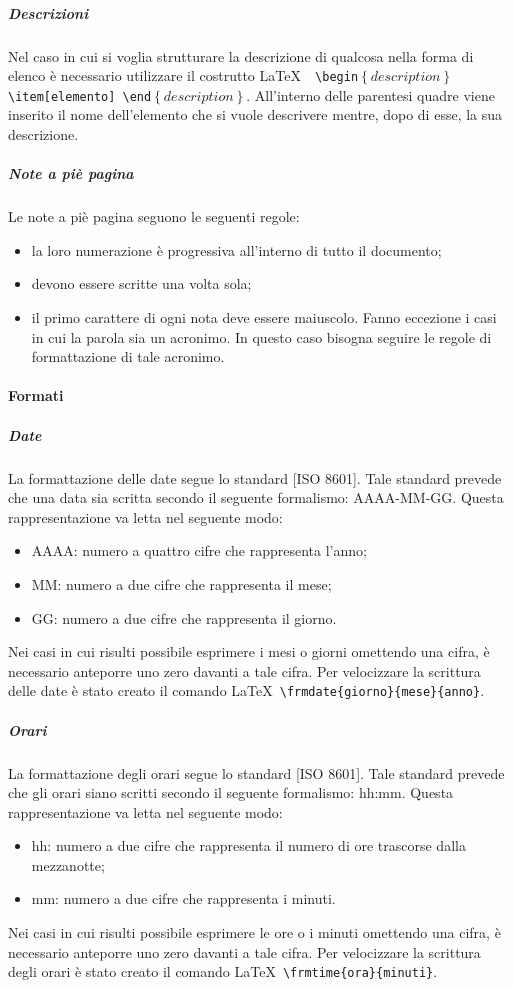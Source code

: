 \documentclass[../NormeProgetto.tex]{subfiles}
\begin{document}
			
			\subparagraph{Descrizioni}
				Nel caso in cui si voglia strutturare la descrizione di qualcosa nella forma di elenco è necessario utilizzare il costrutto \LaTeX\ \texttt{ \textbackslash begin$\left\{description\right\}$ \textbackslash item[elemento] \textbackslash end$\left\{description\right\}$}. All'interno delle parentesi quadre viene inserito il nome dell'elemento che si vuole descrivere mentre, dopo di esse, la sua descrizione.					
			
			\subparagraph{Note a piè pagina}
				Le note a piè pagina seguono le seguenti regole:
				\begin{itemize}
					\item la loro numerazione è progressiva all'interno di tutto il documento;
					\item devono essere scritte una volta sola;
					\item il primo carattere di ogni nota deve essere maiuscolo. Fanno eccezione i casi in cui la parola sia un acronimo. In questo caso bisogna seguire le regole di formattazione di tale acronimo.
				\end{itemize}
			
		\paragraph{Formati}
			\subparagraph{Date}
				La formattazione delle date segue lo standard [ISO 8601]. Tale standard prevede che una data sia scritta secondo il seguente formalismo: AAAA-MM-GG. Questa rappresentazione va letta nel seguente modo:
				\begin{itemize}
					\item AAAA: numero a quattro cifre che rappresenta l'anno;
					\item MM: numero a due cifre che rappresenta il mese;
					\item GG: numero a due cifre che rappresenta il giorno.
				\end{itemize}
				Nei casi in cui risulti possibile esprimere i mesi o giorni omettendo una cifra, è necessario anteporre uno zero davanti a tale cifra. Per velocizzare la scrittura delle date è stato creato il comando \LaTeX\ \texttt{\textbackslash frmdate\{giorno\}\{mese\}\{anno\}}.
			
			\subparagraph{Orari}
				La formattazione degli orari segue lo standard [ISO 8601]. Tale standard prevede che gli orari siano scritti secondo il seguente formalismo: hh:mm. Questa rappresentazione va letta nel seguente modo:
				\begin{itemize}
					\item hh: numero a due cifre che rappresenta il numero di ore trascorse dalla mezzanotte;
					\item mm: numero a due cifre che rappresenta i minuti. 
				\end{itemize}						
				Nei casi in cui risulti possibile esprimere le ore o i minuti omettendo una cifra, è necessario anteporre uno zero davanti a tale cifra. Per velocizzare la scrittura degli orari è stato creato il comando \LaTeX\ \texttt{\textbackslash frmtime\{ora\}\{minuti\}}.
			
\end{document}

